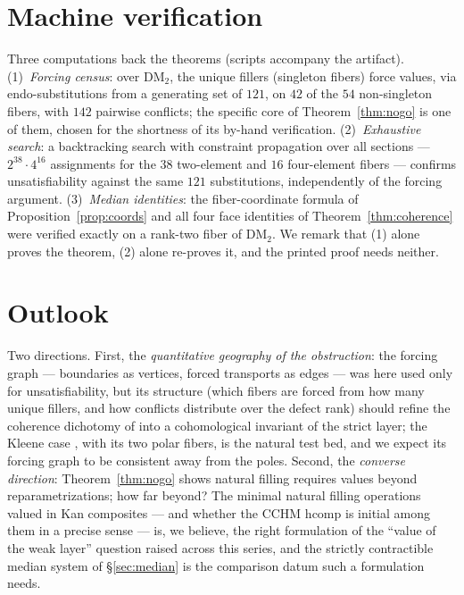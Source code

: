 \documentclass[11pt]{amsart}
\theoremstyle{definition}
\newcommand{\DM}{\mathrm{DM}}
\begin{document}
\section{Machine verification}
\label{sec:machine}

Three computations back the theorems (scripts accompany the
artifact).  (1)~\emph{Forcing census}: over $\DM_2$, the unique
fillers (singleton fibers) force values, via endo-substitutions
from a generating set of $121$, on $42$ of the $54$ non-singleton
fibers, with $142$ pairwise conflicts; the specific core of
Theorem~\ref{thm:nogo} is one of them, chosen for the shortness of
its by-hand verification.  (2)~\emph{Exhaustive search}: a
backtracking search with constraint propagation over all sections
--- $2^{38} \cdot 4^{16}$ assignments for the $38$ two-element and
$16$ four-element fibers --- confirms unsatisfiability against the
same $121$ substitutions, independently of the forcing argument.
(3)~\emph{Median identities}: the fiber-coordinate formula of
Proposition~\ref{prop:coords} and all four face identities of
Theorem~\ref{thm:coherence} were verified exactly on a rank-two
fiber of $\DM_2$.  We remark that (1) alone proves the theorem, (2)
alone re-proves it, and the printed proof needs neither.

\section{Outlook}
\label{sec:outlook}

Two directions.  First, the \emph{quantitative geography of the
obstruction}: the forcing graph --- boundaries as vertices, forced
transports as edges --- was here used only for unsatisfiability,
but its structure (which fibers are forced from how many unique
fillers, and how conflicts distribute over the defect rank) should
refine the coherence dichotomy of \cite{StrictDM} into a
cohomological invariant of the strict layer; the Kleene case
\cite{Kleene}, with its two polar fibers, is the natural test bed,
and we expect its forcing graph to be consistent away from the
poles.  Second, the \emph{converse direction}: Theorem~\ref{thm:nogo}
shows natural filling requires values beyond reparametrizations;
how far beyond?  The minimal natural filling operations valued in
Kan composites --- and whether the CCHM $\mathrm{hcomp}$ is initial
among them in a precise sense --- is, we believe, the right
formulation of the ``value of the weak layer'' question raised
across this series, and the strictly contractible median system of
\S\ref{sec:median} is the comparison datum such a formulation
needs.
\end{document}
